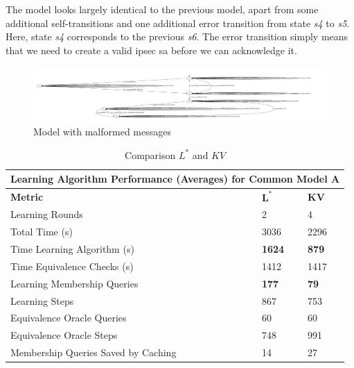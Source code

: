 The model looks largely identical to the previous model, apart from some additional self-transitions and one additional error transition from state \emph{s4} to \emph{s5}. Here, state \emph{s4} corresponds to the previous \emph{s6}. The error transition simply means that we need to create a valid \ac{ipsec} \ac{sa} before we can acknowledge it.

\begin{figure}
	\centering
	\includegraphics[width=\linewidth]{images/models/WithFilterWithErrors_kv}
	\caption{Model with malformed messages}
	\label{fig:withfilterwitherrors}
\end{figure}

\begin{table}[t]
	\centering
	\begin{tabular}{ |p{6.5cm}||p{1cm}|p{1cm}|  }
		\hline
		\multicolumn{3}{|c|}{\textbf{Learning Algorithm Performance (Averages) for Common Model A}} \\
		\hline
		\textbf{Metric} & $\mathbf{L^*}$ & $\mathbf{KV}$ \\
		\hline
		Learning Rounds							&	2				&	4 				\\
		Total Time (s)							&   3036			& 	2296   			\\
		Time Learning Algorithm	(s)				&	\textbf{1624}	& 	\textbf{879}	\\
		Time Equivalence Checks (s)				& 	1412			& 	1417			\\
		Learning Membership Queries 			&   \textbf{177}	& 	\textbf{79}		\\
		Learning Steps							& 	867	  			& 	753   			\\
		Equivalence Oracle Queries				& 	60  			&  	60				\\
		Equivalence Oracle Steps				& 	748  			&  	991				\\
		Membership Queries Saved by Caching		& 	14  			&  	27				\\
		\hline
	\end{tabular}
	\caption{Comparison $L^*$ and $KV$}
	\label{tab:commonmodel_a}
\end{table}

